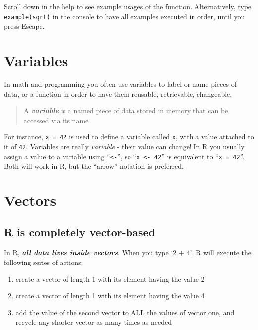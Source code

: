 \documentclass[]{book}
\providecommand{\tightlist}{%
  \setlength{\itemsep}{0pt}\setlength{\parskip}{0pt}}
\begin{document}
Scroll down in the help to see example usages of the function. Alternatively, type \texttt{example(sqrt)} in the console to have all examples executed in order, until you press Escape.

\hypertarget{variables}{%
\section{Variables}\label{variables}}

In math and programming you often use variables to label or name pieces of data, or a function in order to have them reusable, retrievable, changeable.

\begin{quote}
A \textbf{\emph{variable}} is a named piece of data stored in memory that can be accessed via its name
\end{quote}

For instance, \texttt{x\ =\ 42} is used to define a variable called \texttt{x}, with a value attached to it of \texttt{42}. Variables are really \emph{variable} - their value can change!
In R you usually assign a value to a variable using ``\texttt{\textless{}-}'', so ``\texttt{x\ \textless{}-\ 42}'' is equivalent to ``\texttt{x\ =\ 42}''. Both will work in R, but the ``arrow'' notation is preferred.

\hypertarget{vectors}{%
\section{Vectors}\label{vectors}}

\hypertarget{r-is-completely-vector-based}{%
\subsection{R is completely vector-based}\label{r-is-completely-vector-based}}

In R, \emph{\textbf{all data lives inside vectors}}. When you type `2 + 4', R will execute the following series of actions:

\begin{enumerate}
\def\labelenumi{\arabic{enumi}.}
\tightlist
\item
  create a vector of length 1 with its element having the value 2
\item
  create a vector of length 1 with its element having the value 4
\item
  add the value of the second vector to ALL the values of vector one, and recycle any shorter vector as many times as needed
\end{enumerate}
\end{document}
